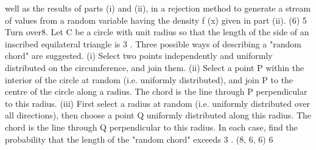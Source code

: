well as the results of parts (i) and (ii), in a rejection method to generate a
stream of values from a random variable having the density f (x) given in
part (ii).
(6)
5
Turn over8.
Let C be a circle with unit radius so that the length of the side of an inscribed
equilateral triangle is 3 . Three possible ways of describing a "random chord" are
suggested.
(i) Select two points independently and uniformly distributed on the
circumference, and join them.
(ii) Select a point P within the interior of the circle at random (i.e. uniformly
distributed), and join P to the centre of the circle along a radius. The chord is
the line through P perpendicular to this radius.
(iii) First select a radius at random (i.e. uniformly distributed over all directions),
then choose a point Q uniformly distributed along this radius. The chord is the
line through Q perpendicular to this radius.
In each case, find the probability that the length of the "random chord" exceeds
3 .
(8, 6, 6)
6
